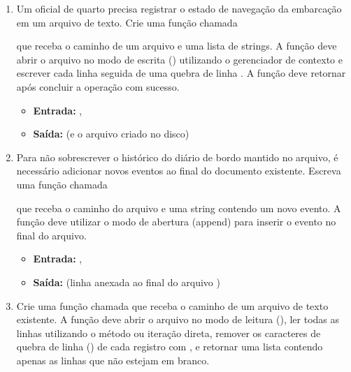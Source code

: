 \begin{enumerate}[label=\textbf{Q\arabic*.}]

\item Um oficial de quarto precisa registrar o estado de navegação da embarcação em um arquivo de texto. Crie uma função chamada 

 que receba o caminho de um arquivo e uma lista de strings. A função deve abrir o arquivo no modo de escrita () utilizando o gerenciador de contexto  e escrever cada linha seguida de uma quebra de linha . A função deve retornar  após concluir a operação com sucesso.

\begin{itemize}
    \item \textbf{Entrada:} , 
    \item \textbf{Saída:}  (e o arquivo  criado no disco)
\end{itemize}



\item Para não sobrescrever o histórico do diário de bordo mantido no arquivo, é necessário adicionar novos eventos ao final do documento existente. Escreva uma função chamada 

 que receba o caminho do arquivo e uma string contendo um novo evento. A função deve utilizar o modo de abertura  (append) para inserir o evento no final do arquivo.

\begin{itemize}
    \item \textbf{Entrada:} , 
    \item \textbf{Saída:}  (linha anexada ao final do arquivo )
\end{itemize}




\item Crie uma função chamada  que receba o caminho de um arquivo de texto existente. A função deve abrir o arquivo no modo de leitura (), ler todas as linhas utilizando o método  ou iteração direta, remover os caracteres de quebra de linha () de cada registro com , e retornar uma lista contendo apenas as linhas que não estejam em branco.


\end{enumerate}
